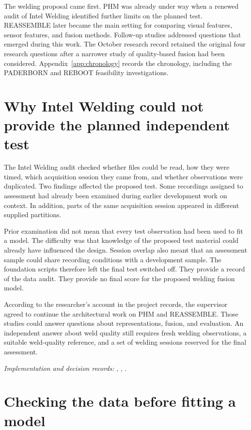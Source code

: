 The welding proposal came first. PHM was already under way when a renewed audit of Intel Welding identified further limits on the planned test. REASSEMBLE later became the main setting for comparing visual features, sensor features, and fusion methods. Follow-up studies addressed questions that emerged during this work. The October research record retained the original four research questions after a narrower study of quality-based fusion had been considered. Appendix~\ref{app:chronology} records the chronology, including the PADERBORN and REBOOT feasibility investigations.

\section{Why Intel Welding could not provide the planned independent test}
\label{sec:ch4-welding}

The Intel Welding audit checked whether files could be read, how they were timed, which acquisition session they came from, and whether observations were duplicated. Two findings affected the proposed test. Some recordings assigned to assessment had already been examined during earlier development work on context. In addition, parts of the same acquisition session appeared in different supplied partitions.

Prior examination did not mean that every test observation had been used to fit a model. The difficulty was that knowledge of the proposed test material could already have influenced the design. Session overlap also meant that an assessment sample could share recording conditions with a development sample. The foundation scripts therefore left the final test switched off. They provide a record of the data audit. They provide no final score for the proposed welding fusion model.

According to the researcher’s account in the project records, the supervisor agreed to continue the architectural work on PHM and REASSEMBLE. Those studies could answer questions about representations, fusion, and evaluation. An independent answer about weld quality still requires fresh welding observations, a suitable weld-quality reference, and a set of welding sessions reserved for the final assessment.

\noindent\textit{Implementation and decision records:} , , .

\section{Checking the data before fitting a model}
\label{sec:ch4-admission}

